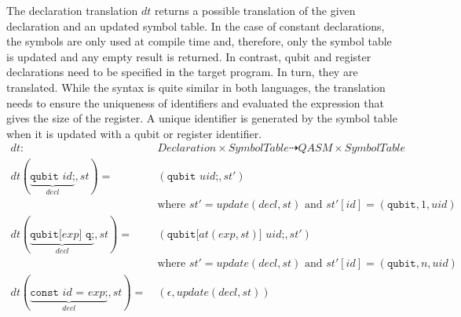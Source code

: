 The declaration translation $dt$ returns a possible translation of the given declaration and an updated symbol table. In the case of constant declarations, the symbols are only used at compile time and, therefore, only the symbol table is updated and any empty result is returned. In contrast, qubit and register declarations need to be specified in the target program. In turn, they are translated. While the syntax is quite similar in both languages, the translation needs to ensure the uniqueness of identifiers and evaluated the expression that gives the size of the register. A unique identifier is generated by the symbol table when it is updated with a qubit or register identifier.
\begin{align*}
    dt : \ & Declaration \times SymbolTable \dashrightarrow QASM \times SymbolTable\\
    dt(\underbrace{\texttt{qubit } id \text{;}}_{decl}, st) = \ & (\texttt{qubit } uid\texttt{;}, st')\\
                                                                & \text{where } st' = update(decl, st) \text{ and } st'[id] = (\texttt{qubit}, 1, uid)\\
    dt(\underbrace{\texttt{qubit[} exp \texttt{] q;}}_{decl}, st) = \ & (\texttt{qubit[} at(exp, st) \texttt{] } uid\texttt{;}, st')\\
                                                                & \text{where } st' = update(decl, st) \text{ and } st'[id] = (\texttt{qubit}, n, uid)\\
    dt(\underbrace{\texttt{const } id \texttt{ = } exp \texttt{;}}_{decl}, st) = \ & (\epsilon, update(decl, st))
\end{align*}

